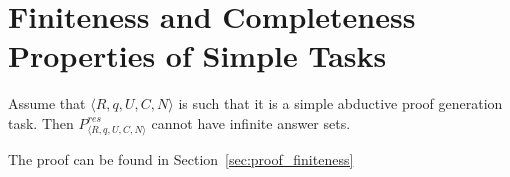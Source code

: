\section{Finiteness and Completeness Properties of Simple Tasks}

\begin{theorem}[Finiteness]\label{thm:finiteness}
Assume that $\langle R,q,U,C,N \rangle$ is such that it is a simple abductive proof generation task. %
Then $P_{\langle R,q,U,C,N \rangle}^{res}$ cannot have infinite answer sets. 
\end{theorem}

The proof can be found in Section~\ref{sec:proof_finiteness}


